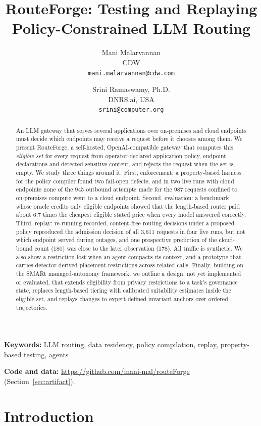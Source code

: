 \documentclass[11pt]{article}
\title{RouteForge: Testing and Replaying\\Policy-Constrained LLM Routing}
\author{Mani Malarvannan\\CDW\\\texttt{mani.malarvannan@cdw.com}
  \and
  Srini Ramaswamy, Ph.D.\\DNRS.ai, USA\\\texttt{srini@computer.org}}
\date{}
\newcommand{\repourl}{\url{https://github.com/mani-mal/routeForge}}
\begin{document}
\maketitle

\begin{abstract}
An LLM gateway that serves several applications over on-premises and cloud endpoints must decide
which endpoints may receive a request before it chooses among them. We present RouteForge, a
self-hosted, OpenAI-compatible gateway that computes this \emph{eligible set} for every request
from operator-declared application policy, endpoint declarations and detected sensitive
content, and rejects the request when the set is empty. We study three things around it. First,
enforcement: a property-based harness for the policy compiler found two fail-open defects, and in
two live runs with cloud endpoints none of the 945 outbound attempts made for the 987 requests
confined to on-premises compute went to a cloud endpoint. Second, evaluation: a benchmark whose
oracle credits only eligible endpoints showed that the length-based router paid about 6.7 times
the cheapest eligible stated price when every model answered correctly. Third, replay: re-running
recorded, content-free routing decisions under a proposed policy reproduced the admission
decision of all 3{,}611 requests in four live runs, but not which endpoint served during outages,
and one prospective prediction of the cloud-bound count (180) was close to the later observation
(178). All traffic is synthetic. We also show a restriction lost when an agent compacts its
context, and a prototype that carries detector-derived placement restrictions across related
calls. Finally, building on the SMARt managed-autonomy framework, we outline a design, not yet
implemented or evaluated, that extends eligibility from privacy restrictions to a task's
governance state, replaces length-based tiering with calibrated suitability estimates inside the
eligible set, and replays changes to expert-defined invariant anchors over ordered trajectories.
\end{abstract}

\noindent\textbf{Keywords:} LLM routing, data residency, policy compilation, replay,
property-based testing, agents

\noindent\textbf{Code and data:} \repourl{} (Section~\ref{sec:artifact}).

\section{Introduction}
\end{document}
